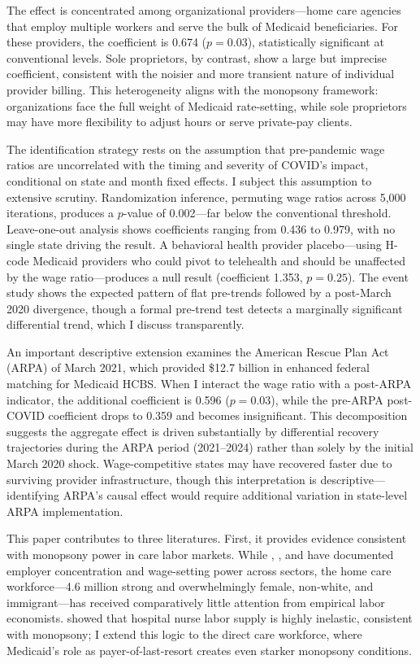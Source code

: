 \documentclass[12pt]{article}
\begin{document}
The effect is concentrated among organizational providers---home care agencies that employ multiple workers and serve the bulk of Medicaid beneficiaries. For these providers, the coefficient is 0.674 ($p = 0.03$), statistically significant at conventional levels. Sole proprietors, by contrast, show a large but imprecise coefficient, consistent with the noisier and more transient nature of individual provider billing. This heterogeneity aligns with the monopsony framework: organizations face the full weight of Medicaid rate-setting, while sole proprietors may have more flexibility to adjust hours or serve private-pay clients.

The identification strategy rests on the assumption that pre-pandemic wage ratios are uncorrelated with the timing and severity of COVID's impact, conditional on state and month fixed effects. I subject this assumption to extensive scrutiny. Randomization inference, permuting wage ratios across 5,000 iterations, produces a $p$-value of 0.002---far below the conventional threshold. Leave-one-out analysis shows coefficients ranging from 0.436 to 0.979, with no single state driving the result. A behavioral health provider placebo---using H-code Medicaid providers who could pivot to telehealth and should be unaffected by the wage ratio---produces a null result (coefficient 1.353, $p = 0.25$). The event study shows the expected pattern of flat pre-trends followed by a post-March 2020 divergence, though a formal pre-trend test detects a marginally significant differential trend, which I discuss transparently.

An important descriptive extension examines the American Rescue Plan Act (ARPA) of March 2021, which provided \$12.7 billion in enhanced federal matching for Medicaid HCBS. When I interact the wage ratio with a post-ARPA indicator, the additional coefficient is 0.596 ($p = 0.03$), while the pre-ARPA post-COVID coefficient drops to 0.359 and becomes insignificant. This decomposition suggests the aggregate effect is driven substantially by differential recovery trajectories during the ARPA period (2021--2024) rather than solely by the initial March 2020 shock. Wage-competitive states may have recovered faster due to surviving provider infrastructure, though this interpretation is descriptive---identifying ARPA's causal effect would require additional variation in state-level ARPA implementation.

This paper contributes to three literatures. First, it provides evidence consistent with monopsony power in care labor markets. While \citet{manning2003monopsony}, \citet{azar2022labor}, and \citet{berger2022labor} have documented employer concentration and wage-setting power across sectors, the home care workforce---4.6 million strong and overwhelmingly female, non-white, and immigrant---has received comparatively little attention from empirical labor economists. \citet{staiger2010prices} showed that hospital nurse labor supply is highly inelastic, consistent with monopsony; I extend this logic to the direct care workforce, where Medicaid's role as payer-of-last-resort creates even starker monopsony conditions.
\end{document}
